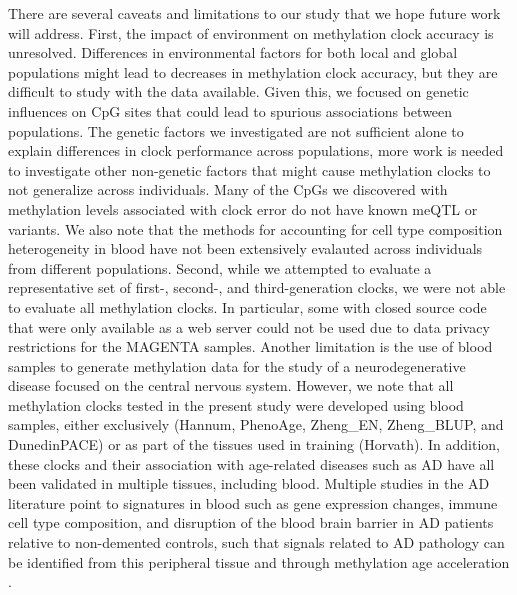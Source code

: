 There are several caveats and limitations to our study that we hope future work will address. First, the impact of environment on methylation clock accuracy is unresolved. Differences in environmental factors for both local and global populations might lead to decreases in methylation clock accuracy, but they are difficult to study with the data available. Given this, we focused on genetic influences on CpG sites that could lead to spurious associations between populations. The genetic factors we investigated are not sufficient alone to explain differences in clock performance across populations, more work is needed to investigate other non-genetic factors that might cause methylation clocks to not generalize across individuals. Many of the CpGs we discovered with methylation levels associated with clock error do not have known meQTL or variants. We also note that the methods for accounting for cell type composition heterogeneity in blood have not been extensively evalauted across individuals from different populations. Second, while we attempted to evaluate a representative set of first-, second-, and third-generation clocks, we were not able to evaluate all methylation clocks. In particular, some with closed source code that were only available as a web server could not be used due to data privacy restrictions for the MAGENTA samples. Another limitation is the use of blood samples to generate methylation data for the study of a neurodegenerative disease focused on the central nervous system. However, we note that all methylation clocks tested in the present study were developed using blood samples, either exclusively (Hannum, PhenoAge, Zheng\_EN, Zheng\_BLUP, and DunedinPACE) or as part of the tissues used in training (Horvath). In addition, these clocks and their association with age-related diseases such as AD have all been validated in multiple tissues, including blood. Multiple studies in the AD literature point to signatures in blood such as gene expression changes, immune cell type composition, and disruption of the blood brain barrier in AD patients relative to non-demented controls, such that signals related to AD pathology can be identified from this peripheral tissue \citep{shigemizu_identification_2022, griswold_immune_2020} and through methylation age acceleration \citep{marioni_dna_2015, raina_cerebral_2017, hodgson_epigenetic_2017}.

